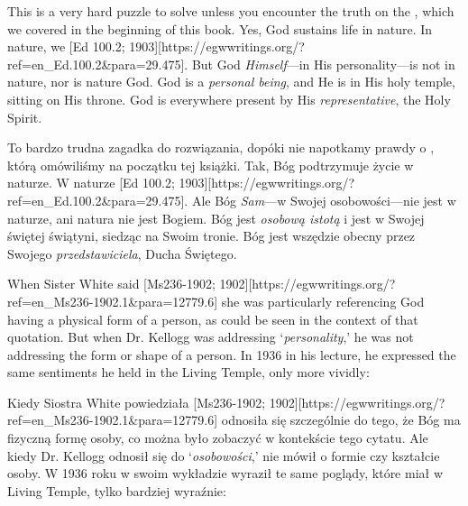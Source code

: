 This is a very hard puzzle to solve unless you encounter the truth on the , which we covered in the beginning of this book. Yes, God sustains life in nature. In nature, we [Ed 100.2; 1903][https://egwwritings.org/?ref=en\_Ed.100.2&para=29.475]. But God \textit{Himself}—in His personality—is not in nature, nor is nature God. God is a \textit{personal being}, and He is in His holy temple, sitting on His throne. God is everywhere present by His \textit{representative}, the Holy Spirit.


To bardzo trudna zagadka do rozwiązania, dopóki nie napotkamy prawdy o , którą omówiliśmy na początku tej książki. Tak, Bóg podtrzymuje życie w naturze. W naturze [Ed 100.2; 1903][https://egwwritings.org/?ref=en\_Ed.100.2&para=29.475]. Ale Bóg \textit{Sam}—w Swojej osobowości—nie jest w naturze, ani natura nie jest Bogiem. Bóg jest \textit{osobową istotą} i jest w Swojej świętej świątyni, siedząc na Swoim tronie. Bóg jest wszędzie obecny przez Swojego \textit{przedstawiciela}, Ducha Świętego.


When Sister White said [Ms236-1902; 1902][https://egwwritings.org/?ref=en\_Ms236-1902.1&para=12779.6] she was particularly referencing God having a physical form of a person, as could be seen in the context of that quotation. But when Dr. Kellogg was addressing ‘\textit{personality},’ he was not addressing the form or shape of a person. In 1936 in his lecture, he expressed the same sentiments he held in the Living Temple, only more vividly:


Kiedy Siostra White powiedziała [Ms236-1902; 1902][https://egwwritings.org/?ref=en\_Ms236-1902.1&para=12779.6] odnosiła się szczególnie do tego, że Bóg ma fizyczną formę osoby, co można było zobaczyć w kontekście tego cytatu. Ale kiedy Dr. Kellogg odnosił się do ‘\textit{osobowości},’ nie mówił o formie czy kształcie osoby. W 1936 roku w swoim wykładzie wyraził te same poglądy, które miał w Living Temple, tylko bardziej wyraźnie:




